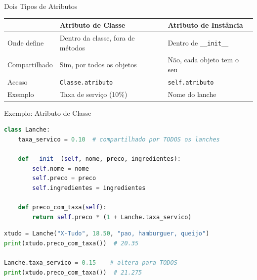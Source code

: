 \documentclass[aspectratio=169]{beamer}
\begin{document}
\begin{frame}{Dois Tipos de Atributos}
  \begin{table}
    \centering
    \begin{tabular}{lll}
      \toprule
      & \textbf{Atributo de Classe} & \textbf{Atributo de Instância} \\
      \midrule
      Onde define  & Dentro da classe, fora de métodos & Dentro de \texttt{\_\_init\_\_} \\
      Compartilhado & Sim, por todos os objetos & Não, cada objeto tem o seu \\
      Acesso       & \texttt{Classe.atributo} & \texttt{self.atributo} \\
      Exemplo      & Taxa de serviço (10\%) & Nome do lanche \\
      \bottomrule
    \end{tabular}
  \end{table}
\end{frame}

\begin{frame}[fragile]{Exemplo: Atributo de Classe}
  \begin{lstlisting}[language=Python]
class Lanche:
    taxa_servico = 0.10  # compartilhado por TODOS os lanches

    def __init__(self, nome, preco, ingredientes):
        self.nome = nome
        self.preco = preco
        self.ingredientes = ingredientes

    def preco_com_taxa(self):
        return self.preco * (1 + Lanche.taxa_servico)
  \end{lstlisting}

  \begin{lstlisting}[language=Python]
xtudo = Lanche("X-Tudo", 18.50, "pao, hamburguer, queijo")
print(xtudo.preco_com_taxa())  # 20.35

Lanche.taxa_servico = 0.15    # altera para TODOS
print(xtudo.preco_com_taxa())  # 21.275
  \end{lstlisting}
\end{frame}
\end{document}
